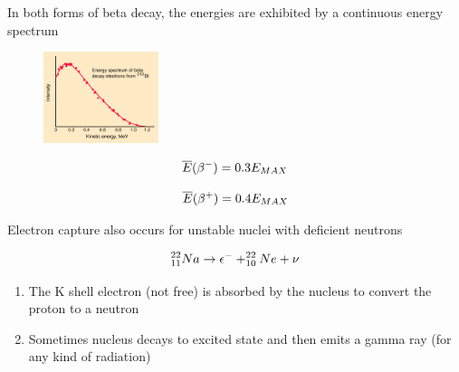 \documentclass[aspectratio=1610,pdftex,dvipsnames,compress,xcolor={dvipsnames}]{beamer}
\begin{document}
\begin{frame}{In both forms of beta decay, the energies are exhibited by a continuous energy spectrum}
    \begin{figure}
        \centering
        \href{http://images.slideplayer.com/17/5357960/slides/slide_24.jpg}{\includegraphics[width=0.30\textwidth]{beta.spectrum.jpg}}
    \end{figure}

    \vspace*{\fill}

    \begin{equation}
        \LARGE
        \overline{E}(\beta^-)=0.3E_{MAX}
    \end{equation}

    \begin{equation}
        \LARGE
        \overline{E}(\beta^+)=0.4E_{MAX}
    \end{equation}
\end{frame}


\begin{frame}{Electron capture also occurs for unstable nuclei with deficient neutrons}

    \begin{equation}
        \LARGE
        ^{22}_{11}Na \rightarrow \epsilon^- + ^{22}_{10}Ne + \nu 
    \end{equation}

    \vspace*{\fill}

    \begin{enumerate}[series=outerlist,topsep=0pt,itemsep=21pt,leftmargin=*,label=(\arabic*)]
        \item[]The K shell electron (not free) is absorbed by the nucleus to convert the proton to a neutron
        \item[]Sometimes nucleus decays to excited state and then emits a gamma ray (for any kind of radiation)
    \end{enumerate}
\end{frame}
\end{document}
